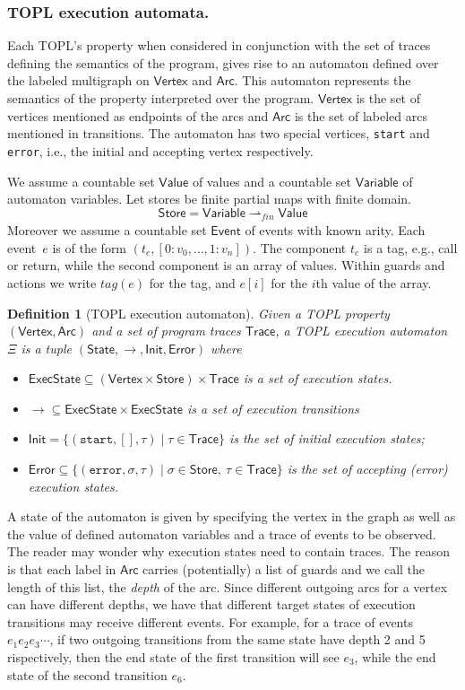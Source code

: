 \documentclass{sigplanconf}[10pt] %
\newcommand{\pmap}{\rightharpoonup}
\newcommand{\set}[1]{\ensuremath{\mathsf{#1}}}
\newtheorem{definition}{Definition}
\begin{document}
\subsubsection{TOPL execution automata.}
\newcommand{\World}{ExecState}

Each TOPL's property when considered in conjunction with the set of traces defining the semantics of the program, gives rise to an automaton defined over the labeled multigraph  on $\set{Vertex}$ and $\set{Arc}$.
This automaton represents the semantics of the property interpreted over the program.
$\set{Vertex}$ is the set of vertices mentioned as endpoints of the arcs and $\set{Arc}$ is the set of labeled arcs mentioned in transitions.
The automaton has two special vertices, {\tt start} and {\tt error},  i.e., the initial and accepting vertex respectively.

We assume a countable set \set{Value} of values and a countable set $\set{Variable}$ of automaton variables.
Let stores be finite partial maps with finite domain.
\[
\set{Store} = \set{Variable} \pmap_{\mathit{fin}} \set{Value}
\]
Moreover we assume a countable set \set{Event} of events with known arity.
Each event~$e$ is of the form $(t_e,[0: v_0,\dots, 1:v_n])$.
The component $t_e$ is a tag, e.g., call or return, while the second component is an array of values.
Within guards and actions we write $tag(e)$ for the tag, and $e[i]$ for the $i$th value of the array.
%
\begin{definition}[TOPL execution automaton]
Given a TOPL property $(\set{Vertex},\set{Arc})$ and a set of program traces $\set{Trace}$, a {\em TOPL execution automaton} $\Xi$ is a tuple
$(\set{State}, \to , \set{Init}, \set{Error})$ where
\begin{itemize}
\item $\set{\World} \subseteq (\set{Vertex}\times \set{Store})\times\set{Trace}$ is a set of {\em execution states}.
\item $\to \subseteq \set{\World} \times \set{\World}$ is a set of {\em execution transitions}
\item $\set{Init}= \{ (\texttt{start}, [], \tau) \mid \tau \in \set{Trace} \}$ is the set of initial execution states;
\item $\set{Error} \subseteq \{ (\texttt{error}, \sigma, \tau) \mid \sigma \in \set{Store},  \ \tau \in \set{Trace} \}$ is the set of accepting (error) execution states.
\end{itemize}
\end{definition}
A state of the automaton is given by specifying the vertex in the graph as well as the value of defined automaton variables and a trace of events to be observed.
The reader may wonder why execution states need to contain traces.
The reason is that each label in $\set{Arc}$ carries (potentially) a list of guards and we call the length of this list, the \emph{depth} of the arc.
Since different outgoing arcs for a vertex can have different depths, we have that different target states of execution transitions may receive different events.
For example, for a trace of events $e_1 e_2 e_3\cdots$, if two outgoing transitions from the same state have depth 2 and 5 rispectively, then the end state of the first transition will see $e_3$, while the end state of the second transition $e_6$.
\end{document}
